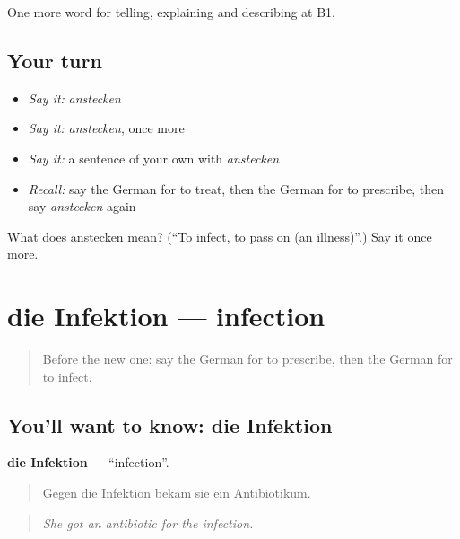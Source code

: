 \begin{grammarlens}[title={What you've built}]
One more word for telling, explaining and describing at B1.
\end{grammarlens}

\subsection*{Your turn}
\begin{itemize}
\raggedright
  \item \emph{Say it:} \emph{anstecken}
  \item \emph{Say it:} \emph{anstecken}, once more
  \item \emph{Say it:} a sentence of your own with \emph{anstecken}
  \item \emph{Recall:} say the German for to treat, then the German for to prescribe, then say \emph{anstecken} again
\end{itemize}

\begin{tcolorbox}[breakable,colback=teal!4,colframe=teal!35!black,title={Before you move on}]
What does anstecken mean? (\textquotedblleft{}To infect, to pass on (an illness)\textquotedblright{}.) Say it once more.
\end{tcolorbox}
\section[die Infektion]{die Infektion — infection}

\label{lesson:GE-C488-infektion}



\begin{quote}
Before the new one: say the German for to prescribe, then the German for to infect.
\end{quote}

\subsection*{You'll want to know: die Infektion}
\textbf{die Infektion} — \textquotedblleft{}infection\textquotedblright{}.

\begin{quote}
Gegen die Infektion bekam sie ein Antibiotikum.
\end{quote}

\begin{quote}
\emph{She got an antibiotic for the infection.}
\end{quote}


